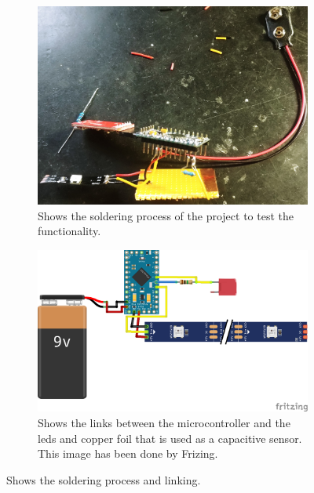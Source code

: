 \documentclass[doc.tex]{subfiles}
\begin{document}
        \begin{figure}[H]
            \centering
            \begin{subfigure}{.45\textwidth}
              \centering
              \includegraphics[width=0.8\linewidth]{images/process/solderingProcess.jpg}
              \caption{Shows the soldering process of the project to test the functionality.}
              \label{fig:01_LaserCut}
              \vspace{6mm}
            \end{subfigure}
            \begin{subfigure}{.45\textwidth}
                \centering
                \includegraphics[width=0.8\linewidth]{images/process/sensorLinks.png}
                \caption{Shows the links between the microcontroller and the leds and copper foil that is 
                used as a capacitive sensor. This image has been done by Frizing. \cite{fritzing}}
                \label{fig:01_LaserCut}
                \vspace{6mm}
              \end{subfigure}
            \caption{Shows the soldering process and linking.}
            \label{fig:laserCutTests}
        \end{figure}
\end{document}
